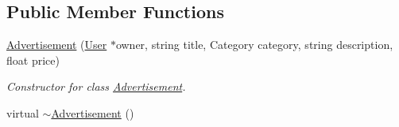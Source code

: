 \subsection*{Public Member Functions}
\begin{DoxyCompactItemize}
\item 
\hyperlink{class_advertisement_aa39584aae7c125c74a9dfe97409ae326}{Advertisement} (\hyperlink{class_user}{User} $\ast$owner, string title, Category category, string description, float price)
\begin{DoxyCompactList}\small\item\em Constructor for class \hyperlink{class_advertisement}{Advertisement}. \end{DoxyCompactList}\item 
\hypertarget{class_advertisement_a49170a22dcd2a8bf88d3ed1aad475b82}{}virtual \hyperlink{class_advertisement_a49170a22dcd2a8bf88d3ed1aad475b82}{$\sim$\+Advertisement} ()\label{class_advertisement_a49170a22dcd2a8bf88d3ed1aad475b82}


\end{DoxyCompactItemize}
